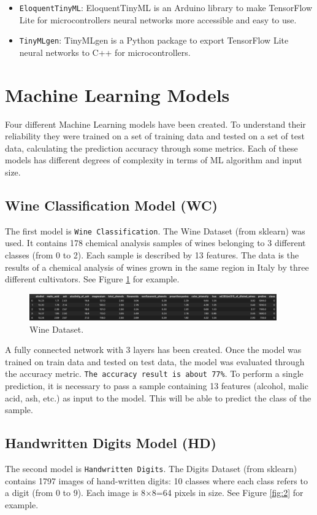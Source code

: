 \documentclass{article}
\begin{document}
\begin{itemize}
    \item \texttt{EloquentTinyML}: EloquentTinyML is an Arduino library to make TensorFlow Lite for microcontrollers neural networks more accessible and easy to use.
    \item \texttt{TinyMLgen}: TinyMLgen is a Python package to export TensorFlow Lite neural networks to C++ for microcontrollers.
\end{itemize} 


\section{Machine Learning Models}
Four different Machine Learning models have been created. To understand their reliability they were trained on a set of training data and tested on a set of test data, calculating the prediction accuracy through some metrics. Each of these models has different degrees of complexity in terms of ML algorithm and input size.

\subsection{Wine Classification Model (WC)}
The first model is \texttt{Wine Classification}. The Wine Dataset (from sklearn) was used. It contains 178 chemical analysis samples of wines belonging to 3 different classes (from 0 to 2). Each sample is described by 13 features. The data is the results of a chemical analysis of wines grown in the same region in Italy by three different cultivators. See Figure \ref{fig:1} for example.

\begin{figure}[H]
    \centering
    \includegraphics[width=0.95\textwidth]{WC-Dataset.png}
    \caption{Wine Dataset.}
    \label{fig:1}
\end{figure}

A fully connected network with 3 layers has been created. Once the model was trained on train data and tested on test data, the model was evaluated through the accuracy metric. \texttt{The accuracy result is about 77\%}. To perform a single prediction, it is necessary to pass a sample containing 13 features (alcohol, malic acid, ash, etc.) as input to the model. This will be able to predict the class of the sample.

\subsection{Handwritten Digits Model (HD)}
The second model is \texttt{Handwritten Digits}. The Digits Dataset (from sklearn) contains 1797 images of hand-written digits: 10 classes where each class refers to a digit (from 0 to 9). Each image is 8×8=64 pixels in size. See Figure \ref{fig:2} for example.
\end{document}
